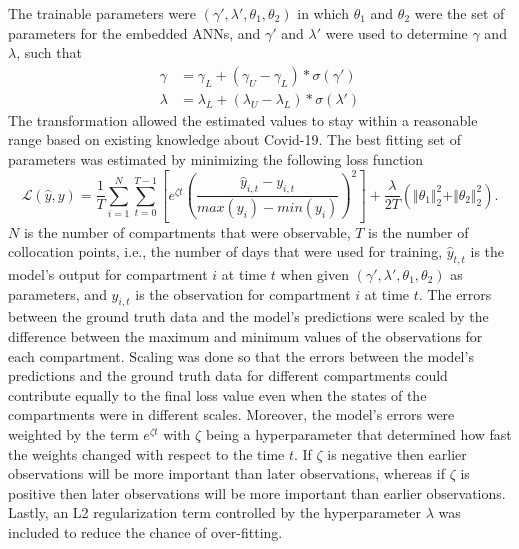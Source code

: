 The trainable parameters were $(\gamma', \lambda', \theta_1, \theta_2)$ in which $\theta_1$ and $\theta_2$ were the set of parameters for the embedded \glspl{ANN}, and $\gamma'$ and $\lambda'$ were used to determine $\gamma$ and $\lambda$, such that
\begin{align*}
    \gamma &= \gamma_L + (\gamma_U - \gamma_L) * \sigma (\gamma') \\
    \lambda &= \lambda_L + (\lambda_U - \lambda_L) * \sigma (\lambda')
\end{align*}
The transformation allowed the estimated values to stay within a reasonable range based on existing knowledge about Covid-19.
The best fitting set of parameters was estimated by minimizing the following loss function
\begin{equation}
    \mathcal{L}(\hat{y}, y) = \frac{1}{T} \sum_{i=1}^N \sum_{t=0}^{T-1} \left[ e^{\zeta t} \left(\frac{\hat{y}_{i,t} - y_{i,t}}{max(y_i) - min(y_i)}\right)^2\right] + \frac{\lambda}{2T} (\Vert\theta_1\Vert^2_2 + \Vert\theta_2\Vert^2_2).
    \label{eq:ude-model-loss}
\end{equation}
$N$ is the number of compartments that were observable, $T$ is the number of collocation points, i.e., the number of days that were used for training, $\hat{y}_{t,t}$ is the model's output for compartment $i$ at time $t$ when given $(\gamma', \lambda', \theta_1, \theta_2)$ as parameters, and $y_{i,t}$ is the observation for compartment $i$ at time $t$.
The errors between the ground truth data and the model's predictions were scaled by the difference between the maximum and minimum values of the observations for each compartment.
Scaling was done so that the errors between the model's predictions and the ground truth data for different compartments could contribute equally to the final loss value even when the states of the compartments were in different scales.
Moreover, the model's errors were weighted by the term $e^{\zeta t}$ with $\zeta$ being a hyperparameter that determined how fast the weights changed with respect to the time $t$.
If $\zeta$ is negative then earlier observations will be more important than later observations, whereas if $\zeta$ is positive then later observations will be more important than earlier observations.
Lastly, an L2 regularization term controlled by the hyperparameter $\lambda$ was included to reduce the chance of over-fitting.

